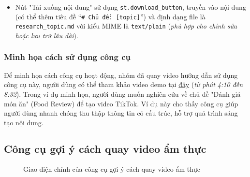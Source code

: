 \begin{enumerate}
\begin{itemize}
        \item Nút "Tải xuống nội dung" sử dụng \texttt{st.download\_button}, truyền vào nội dung (có thể thêm tiêu đề ``\texttt{\# Chủ đề: [topic]}'') và định dạng file là \texttt{research\_topic.md} với kiểu MIME là \texttt{text/plain} (\textit{phù hợp cho chỉnh sửa hoặc lưu trữ lâu dài}).
    \end{itemize}
    
\end{enumerate}

\subsubsection{Minh họa cách sử dụng công cụ}

Để minh họa cách công cụ hoạt động, nhóm đã quay video hướng dẫn sử dụng công cụ này, người dùng có thể tham khảo video demo tại \href{https://youtu.be/m-cdmfVc2rk?list=PL3SfxVDJ_Zc6DvBKVd6xUc-exmt0AyA7x&t=246}{đây} (\textit{từ phút 4:10 đến 8:32}). Trong ví dụ minh họa, người dùng muốn nghiên cứu về chủ đề "Đánh giá món ăn" (Food Review) để tạo video TikTok. Ví dụ này cho thấy công cụ giúp người dùng nhanh chóng thu thập thông tin có cấu trúc, hỗ trợ quá trình sáng tạo nội dung.

\subsection{Công cụ gợi ý cách quay video ẩm thực}

\begin{figure}[H]
    \centering
    \caption{Giao diện chính của công cụ gợi ý cách quay video ẩm thực}
    \label{fig:suggestion_main_page}
\end{figure}

